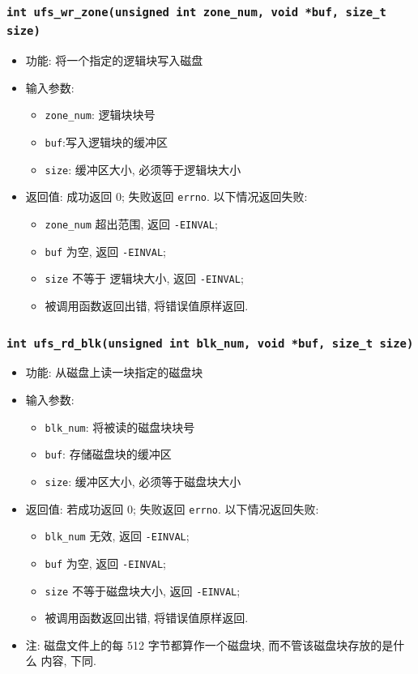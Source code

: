 \documentclass[nofonts, titlepage]{ctexart}
\begin{document}
  \subsubsection[\texttt{ufs\_wr\_zone}]{\texttt{int ufs\_wr\_zone(unsigned int zone\_num, void *buf, size\_t size)}}
  \begin{itemize}
\item
  功能: 将一个指定的逻辑块写入磁盘
\item
  输入参数:

  \begin{itemize}
  \item
    \texttt{zone\_num}: 逻辑块块号
  \item
    \texttt{buf}:写入逻辑块的缓冲区
  \item
    \texttt{size}: 缓冲区大小, 必须等于逻辑块大小
  \end{itemize}
\item
  返回值: 成功返回 0; 失败返回 \texttt{errno}. 以下情况返回失败:

  \begin{itemize}
  \item
    \texttt{zone\_num} 超出范围, 返回 \texttt{-EINVAL};
  \item
    \texttt{buf} 为空, 返回 \texttt{-EINVAL};
  \item
    \texttt{size} 不等于 逻辑块大小, 返回 \texttt{-EINVAL};
  \item
    被调用函数返回出错, 将错误值原样返回.
  \end{itemize}
  \end{itemize}
  \subsubsection[\texttt{ufs\_rd\_blk}]{\texttt{int ufs\_rd\_blk(unsigned int blk\_num, void *buf, size\_t size)}}
  \begin{itemize}
\item
  功能: 从磁盘上读一块指定的磁盘块
\item
  输入参数:

  \begin{itemize}
  \item
    \texttt{blk\_num}: 将被读的磁盘块块号
  \item
    \texttt{buf}: 存储磁盘块的缓冲区
  \item
    \texttt{size}: 缓冲区大小, 必须等于磁盘块大小
  \end{itemize}
\item
  返回值: 若成功返回 0; 失败返回 \texttt{errno}. 以下情况返回失败:

  \begin{itemize}
  \item
    \texttt{blk\_num} 无效, 返回 \texttt{-EINVAL};
  \item
    \texttt{buf} 为空, 返回 \texttt{-EINVAL};
  \item
    \texttt{size} 不等于磁盘块大小, 返回 \texttt{-EINVAL};
  \item
    被调用函数返回出错, 将错误值原样返回.
  \end{itemize}
\item
  注: 磁盘文件上的每 512 字节都算作一个磁盘块,
  而不管该磁盘块存放的是什么 内容, 下同.
  \end{itemize}
\end{document}
